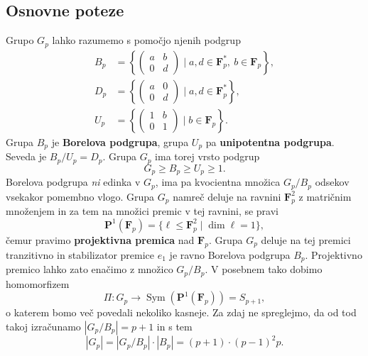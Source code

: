 \documentclass[11pt]{book}
\def\FF{\mathbf{F}}
\def\PP{\mathbf{P}}
\DeclareMathOperator\Sym{Sym}
\def\definicija{\color{rdeca}\bf}
\theoremstyle{definition}
\theoremstyle{zgled}
\theoremstyle{zgledbrezstevilke}
\theoremstyle{odprtproblem}
\theoremstyle{domacanaloga}
\theoremstyle{izrek}
\begin{document}
\subsection{Osnovne poteze}

Grupo $G_p$ lahko razumemo s pomočjo njenih podgrup
\begin{align*}
    B_p &= \left\{ \begin{pmatrix} a & b \\ 0 & d \end{pmatrix} \mid a,d \in \FF_p^*, \ b \in \FF_p \right\}, \\
    D_p &= \left\{ \begin{pmatrix} a & 0 \\ 0 & d \end{pmatrix} \mid a,d \in \FF_p^* \right\}, \\
    U_p &= \left\{ \begin{pmatrix} 1 & b \\ 0 & 1 \end{pmatrix} \mid b \in \FF_p \right\}.
\end{align*}
Grupa $B_p$ je {\definicija Borelova podgrupa}, grupa $U_p$ pa {\definicija unipotentna podgrupa}. Seveda je $B_p/U_p = D_p$. Grupa $G_p$ ima torej vrsto podgrup
\[
    G_p \geq B_p \geq U_p \geq 1.
\]
Borelova podgrupa \emph{ni} edinka v $G_p$, ima pa kvocientna množica $G_p/B_p$  odsekov vsekakor pomembno vlogo. Grupa $G_p$ namreč deluje na ravnini $\FF_p^2$ z matričnim množenjem in za tem na množici premic v tej ravnini, se pravi
\[
    \PP^1(\FF_p) = \{ \ell \leq \FF_p^2 \mid \dim \ell = 1 \},
\]
čemur pravimo {\definicija projektivna premica} nad $\FF_p$. Grupa $G_p$ deluje na tej premici tranzitivno in stabilizator premice $e_1$ je ravno Borelova podgrupa $B_p$. Projektivno premico lahko zato enačimo z množico $G_p/B_p$. V posebnem tako dobimo homomorfizem 
\[
    \Pi \colon G_p \to \Sym(\PP^1(\FF_p)) = S_{p+1},
\]
o katerem bomo več povedali nekoliko kasneje. Za zdaj ne spreglejmo, da od tod takoj izračunamo $|G_p/B_p| = p+1$ in s tem 
\[
    |G_p| = |G_p/B_p| \cdot |B_p| = (p+1) \cdot (p-1)^2 p.
\]
\end{document}
